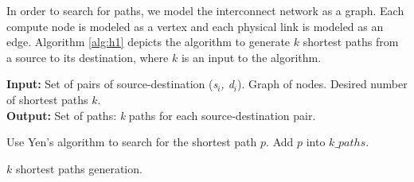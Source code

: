 In order to search for paths, we model the interconnect network as a graph. Each compute node is modeled as a vertex and each physical link is modeled as an edge. Algorithm \ref{alg:h1} depicts the algorithm to generate $k$ shortest paths from a source to its destination, where $k$ is an input to the algorithm.
\begin{algorithm}[!htbp]
\textbf{Input:} Set of pairs of source-destination (\textit{s$_i$, d$_i$}). Graph of nodes. Desired number of shortest paths $k$.\\
\textbf{Output:} Set of paths: \textit{k} paths for each source-destination pair.\\
\begin{algorithmic}
	\State Use Yen's algorithm to search for the shortest path $p$.
        \State Add $p$ into $k\_paths$.
    \EndWhile
\EndFor
\end{algorithmic}
\caption{$k$ shortest paths generation.}
\label{alg:h1}
\end{algorithm}



